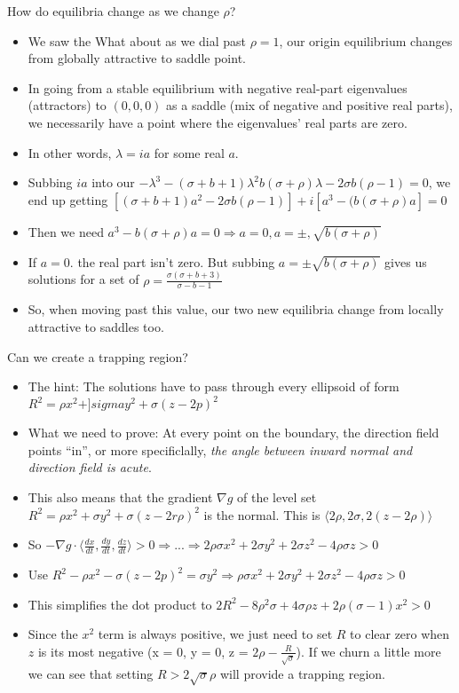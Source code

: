 \documentclass[11pt, oneside]{article}   	%
\begin{document}
How do equilibria change as we change $\rho$?
\begin{itemize}
\item We saw the What about as we dial past $\rho = 1$, our origin equilibrium changes from globally attractive to saddle point.
\item In going from a stable equilibrium with negative real-part eigenvalues (attractors) to $(0,0,0)$ as a saddle (mix of negative and positive real parts), we necessarily have a point where the eigenvalues' real parts are zero.
\item In other words, $\lambda = ia$ for some real $a$.
\item Subbing $ia$ into our $-\lambda^3 - (\sigma + b + 1)\lambda^2 b(\sigma + \rho)\lambda - 2\sigma b(\rho - 1) = 0$, we end up getting 
 $[(\sigma + b + 1)a^2 - 2\sigma b(\rho - 1)] + i[a^3-(b(\sigma + \rho)a]= 0$
\item Then we need $a^3 - b(\sigma + \rho)a = 0 \Rightarrow a = 0, a = \pm, \sqrt{b(\sigma + \rho)}$
\item If $a = 0$. the real part isn't zero.  But subbing $a = \pm \sqrt{b(\sigma + \rho)}$ gives us solutions for a set of $\rho = \frac{\sigma(\sigma + b + 3)}{\sigma - b - 1}$
\item So, when moving past this value, our two new equilibria change from locally attractive to saddles too.
\end{itemize}

Can we create a trapping region?
\begin{itemize}
\item The hint: The solutions have to pass through every ellipsoid of form $R^2 = \rho x^2 + ]sigma y^2 + \sigma (z-2p)^2$
\item What we need to prove: At every point on the boundary, the direction field points ``in'', or more specificlally, \emph{the angle between inward normal and direction field is acute}.
\item This also means that the gradient $\nabla g$ of the level set $R^2 = \rho x^2 + \sigma y^2 + \sigma (z-2r\rho)^2$ is the normal. This is $\langle 2\rho, 2\sigma, 2(z-2\rho)\rangle$
\item So $-\nabla g \cdot \langle \frac{dx}{dt},\frac{dy}{dt},\frac{dz}{dt} \rangle > 0 \Rightarrow ... \Rightarrow 2 \rho\sigma x^2+2\sigma y^2 + 2\sigma z^2-4\rho\sigma z > 0$
\item Use $R^2 - \rho x^2 -\sigma (z-2p)^2  =  \sigma y^2 \Rightarrow \rho\sigma x^2+2\sigma y^2 + 2\sigma z^2-4\rho\sigma z > 0$
\item This simplifies the dot product to $2R^2 - 8\rho^2\sigma + 4\sigma \rho z + 2 \rho (\sigma-1)x^2 > 0$
\item Since the $x^2$ term is always positive, we just need to set $R$ to clear zero when $z$ is its most negative (x = 0, y = 0, z = $2\rho - \frac{R}{\sqrt{\sigma}}$).  If we churn a little more we can see that setting $R > 2\sqrt{\sigma}\rho$ will provide a trapping region.

\end{itemize}
\end{document}
